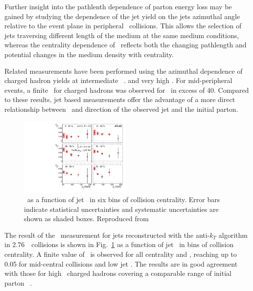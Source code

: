 Further insight into the pathlenth dependence of parton energy 
loss may be gained by studying the dependence of the jet yield
on the jets azimuthal angle relative to the event plane
in peripheral \PbPb\ collisions. This allows the selection of jets 
traversing different length of the medium at the same medium 
conditions, whereas the centrality dependence of \Rcp\ reflects 
both the changing pathlength and potential changes in the medium
density with centrality.

Related measurements have been performed using the azimuthal dependence 
of charged hadron yields at intermediate \pT\
\cite{Adams:2004wz,Adler:2006bw,Adare:2010sp, ATLAS:2011ah, Abelev:2012di}. 
and very high \pT \cite{Chatrchyan:2012xq}. For mid-peripheral events,
a finite \vtwo\ for charged hadrons was observed for \pT\ in excess of 40\GeVc.
Compared to these results, jet based measurements offer the advantage
of a more direct relationship between \pT\ and direction of the observed 
jet and the initial parton.

\begin{figure}[!h]
\begin{center}
\includegraphics[width=0.49\textwidth]{jetfigures/ATLAS_jetv2.pdf}
\caption{\vtjet\ as a function of jet \pT\ in six bins of 
collision centrality.
Error bars indicate statistical uncertainties and 
systematic uncertainties are shown as shaded boxes. Reproduced from~\cite{}}
\label{fig:GR:ATLAS_jet_v2}
\end{center}
\end{figure}

The result of the \vtwo\ measurement for jets reconstructed with the anti-$k_T$ 
algorithm in 2.76\TeV\ \PbPb\ collisions is shown in Fig.~\ref{fig:GR:ATLAS_jet_v2}
as a function of jet \pT\ in bins of collision centrality. A finite
value of \vtwo\ is observed for all centrality and \pT, reaching up to 0.05 for
mid-central collisions and low jet \pT. The results are in good agreement
with those for high \pT\ charged hadrons covering a comparable range
of initial parton \pT~\cite{Chatrchyan:2012xq}.

